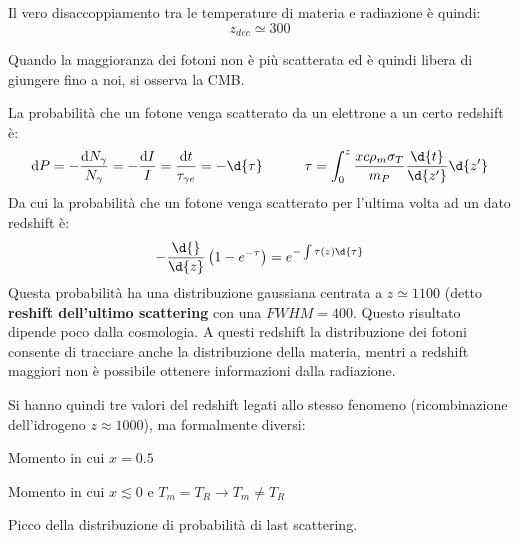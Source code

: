 {Il vero disaccoppiamento tra le temperature di materia e radiazione è quindi:
$$ z_{dec} \simeq 300 $$

Quando la maggioranza dei fotoni non è più scatterata ed è quindi libera di giungere fino a noi, si osserva la CMB.


La probabilità che un fotone venga scatterato da un elettrone a un certo redshift è:
\begin{equation}
    \mathrm{d}P=-\frac{\mathrm{d}N_\gamma}{N_\gamma}=-\frac{\mathrm{d}I}{I}=\frac{\mathrm{d}t}{\tau_{\gamma e}}=-\d{\tau} \qquad\quad \tau=\int_0^z \frac{xc\rho_m \sigma_T }{m_P}\frac{\d{t}}{\d{z'}}\d{z'}
\end{equation}
Da cui la probabilità che un fotone venga scatterato per l'ultima volta ad un dato redshift è:
\begin{equation}
    -\frac{\d{}}{\d{z}}\left( 1-e^{-\tau} \right)=e^{-\int \tau (z)\d{\tau}}
\end{equation}
Questa probabilità ha una distribuzione gaussiana centrata a $z\simeq 1100$ (detto \textbf{reshift dell'ultimo scattering} con una $FWHM=400$. Questo risultato dipende poco dalla cosmologia. A questi redshift la distribuzione dei fotoni consente di tracciare anche la distribuzione della materia, mentri a redshift maggiori non è possibile ottenere informazioni dalla radiazione.

\vspace{1em}
Si hanno quindi tre valori del redshift legati allo stesso fenomeno (ricombinazione dell'idrogeno $z\approx 1000$), ma formalmente diversi:
\begin{example}[Ricombinazione: $\mathbf{z_{rec}=1500}$]
Momento in cui $x=0.5 $
\end{example}
\begin{example}[Disaccoppiamento:  $\mathbf{z_{dec}=300}$]
Momento in cui $x\lesssim 0$ e $T_m=T_R \rightarrow T_m \neq T_R $
\end{example}
\begin{example}[Last Scattering:  $\mathbf{z_{LS}=1100}$]
Picco della distribuzione di probabilità di last scattering.
\end{example}

}
